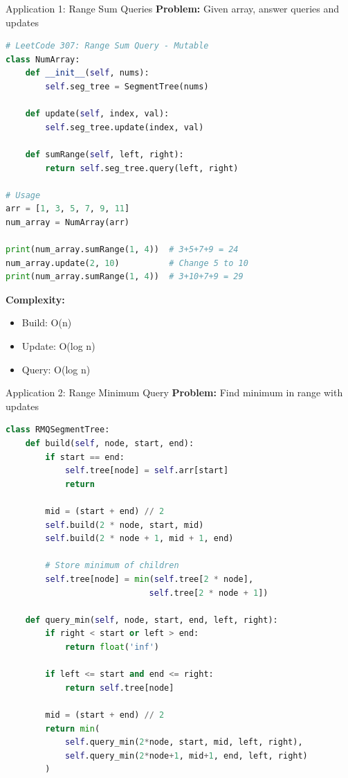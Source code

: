 \documentclass[aspectratio=169]{beamer}
\begin{document}
\begin{frame}[fragile]{Application 1: Range Sum Queries}
  \textbf{Problem:} Given array, answer queries and updates

  \begin{lstlisting}[language=Python, basicstyle=\ttfamily\footnotesize]
# LeetCode 307: Range Sum Query - Mutable
class NumArray:
    def __init__(self, nums):
        self.seg_tree = SegmentTree(nums)

    def update(self, index, val):
        self.seg_tree.update(index, val)

    def sumRange(self, left, right):
        return self.seg_tree.query(left, right)

# Usage
arr = [1, 3, 5, 7, 9, 11]
num_array = NumArray(arr)

print(num_array.sumRange(1, 4))  # 3+5+7+9 = 24
num_array.update(2, 10)          # Change 5 to 10
print(num_array.sumRange(1, 4))  # 3+10+7+9 = 29
  \end{lstlisting}

  \textbf{Complexity:}
  \begin{itemize}
    \item Build: O(n)
    \item Update: O(log n)
    \item Query: O(log n)
  \end{itemize}
\end{frame}

\begin{frame}[fragile]{Application 2: Range Minimum Query}
  \textbf{Problem:} Find minimum in range with updates

  \begin{lstlisting}[language=Python, basicstyle=\ttfamily\footnotesize]
class RMQSegmentTree:
    def build(self, node, start, end):
        if start == end:
            self.tree[node] = self.arr[start]
            return

        mid = (start + end) // 2
        self.build(2 * node, start, mid)
        self.build(2 * node + 1, mid + 1, end)

        # Store minimum of children
        self.tree[node] = min(self.tree[2 * node],
                             self.tree[2 * node + 1])

    def query_min(self, node, start, end, left, right):
        if right < start or left > end:
            return float('inf')

        if left <= start and end <= right:
            return self.tree[node]

        mid = (start + end) // 2
        return min(
            self.query_min(2*node, start, mid, left, right),
            self.query_min(2*node+1, mid+1, end, left, right)
        )
  \end{lstlisting}
\end{frame}
\end{document}
